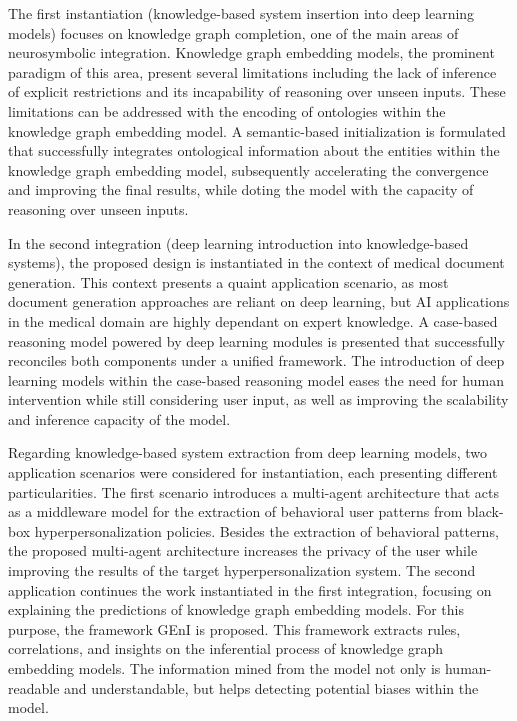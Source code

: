 The first instantiation (knowledge-based system insertion into deep learning models) focuses on knowledge graph completion, one of the main areas of neurosymbolic integration. Knowledge graph embedding models, the prominent paradigm of this area, present several limitations including the lack of inference of explicit restrictions and its incapability of reasoning over unseen inputs. These limitations can be addressed with the encoding of ontologies within the knowledge graph embedding model. A semantic-based initialization is formulated that successfully integrates ontological information about the entities within the knowledge graph embedding model, subsequently accelerating the convergence and improving the final results, while doting the model with the capacity of reasoning over unseen inputs.

In the second integration (deep learning introduction into knowledge-based systems), the proposed design is instantiated in the context of medical document generation. This context presents a quaint application scenario, as most document generation approaches are reliant on deep learning, but AI applications in the medical domain are highly dependant on expert knowledge. A case-based reasoning model powered by deep learning modules is presented that successfully reconciles both components under a unified framework. The introduction of deep learning models within the case-based reasoning model eases the need for human intervention while still considering user input, as well as improving the scalability and inference capacity of the model. 

Regarding knowledge-based system extraction from deep learning models, two application scenarios were considered for instantiation, each presenting different particularities. The first scenario introduces a multi-agent architecture that acts as a middleware model for the extraction of behavioral user patterns from black-box hyperpersonalization policies. Besides the extraction of behavioral patterns, the proposed multi-agent architecture increases the privacy of the user while improving the results of the target hyperpersonalization system. The second application continues the work instantiated in the first integration, focusing on explaining the predictions of knowledge graph embedding models. For this purpose, the framework GEnI is proposed. This framework extracts rules, correlations, and insights on the inferential process of knowledge graph embedding models. The information mined from the model not only is human-readable and understandable, but helps detecting potential biases within the model. 

